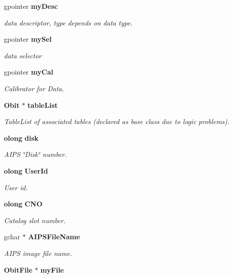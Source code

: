 \begin{CompactItemize}
gpointer {\bf my\-Desc}
\begin{CompactList}\small\item\em data descriptor, type depends on data type. \item\end{CompactList}\item 
gpointer {\bf my\-Sel}
\begin{CompactList}\small\item\em data selector \item\end{CompactList}\item 
gpointer {\bf my\-Cal}
\begin{CompactList}\small\item\em Calibrator for Data. \item\end{CompactList}\item 
{\bf Obit} $\ast$ {\bf table\-List}
\begin{CompactList}\small\item\em Table\-List of associated tables (declared as base class due to logic problems). \item\end{CompactList}\item 
{\bf olong} {\bf disk}
\begin{CompactList}\small\item\em AIPS \char`\"{}Disk\char`\"{} number. \item\end{CompactList}\item 
{\bf olong} {\bf User\-Id}
\begin{CompactList}\small\item\em User id. \item\end{CompactList}\item 
{\bf olong} {\bf CNO}
\begin{CompactList}\small\item\em Catalog slot number. \item\end{CompactList}\item 
gchar $\ast$ {\bf AIPSFile\-Name}
\begin{CompactList}\small\item\em AIPS image file name. \item\end{CompactList}\item 
{\bf Obit\-File} $\ast$ {\bf my\-File}

\end{CompactItemize}
